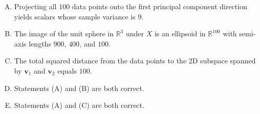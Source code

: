 \documentclass[12pt]{amsart}
\begin{document}
\begin{enumerate}[(A)]
\item Projecting all $100$ data points onto the first principal component direction yields 
scalars whose sample variance is $9$.
\item The image of the unit sphere in $\mathbb{R}^3$ under $X$ is an ellipsoid in 
$\mathbb{R}^{100}$ with semi-axis lengths $900$, $400$, and $100$.
\item The total squared distance from the data points to the 2D subspace spanned by 
$\mathbf{v}_1$ and $\mathbf{v}_2$ equals $100$.
\item Statements (A) and (B) are both correct.
\item Statements (A) and (C) are both correct.
\end{enumerate}
%
%
%
%
%
\end{document}
